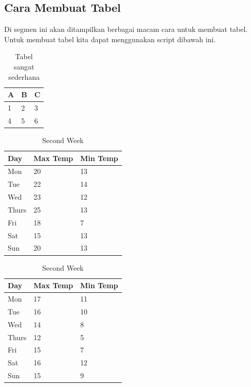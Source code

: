 \subsection{Cara Membuat Tabel}{
    Di segmen ini akan ditampilkan berbagai macam cara untuk membuat tabel. Untuk membuat tabel kita dapat menggunakan script dibawah ini. 
    \begin{table}[h]
        \centering
        \caption{Tabel sangat sederhana}
        \label{tab:abc}
        \begin{tabular}{| l | l | l |}
            \hline
            A & B & C \\
            \hline
            1 & 2 & 3 \\
            4 & 5 & 6 \\
            \hline
        \end{tabular}
    \end{table}

    \begin{table}[h]
        \centering
        \caption{Suhu max dan min di bulan Juni}
        \label{tab:temps}
        \begin{subtable}[h]{0.45\textwidth}
            \centering
            \begin{tabular}{l | l | l}
            Day & Max Temp & Min Temp \\
            \hline \hline
            Mon & 20 & 13\\
            Tue & 22 & 14\\
            Wed & 23 & 12\\
            Thurs & 25 & 13\\
            Fri & 18 & 7\\
            Sat & 15 & 13\\
            Sun & 20 & 13
           \end{tabular}
           \caption{First Week}
           \label{tab:week1}
        \end{subtable}
        \hfill
        \begin{subtable}[h]{0.45\textwidth}
            \centering
            \begin{tabular}{l | l | l}
            Day & Max Temp & Min Temp \\
            \hline \hline
            Mon & 17 & 11\\
            Tue & 16 & 10\\
            Wed & 14 & 8\\
            Thurs & 12 & 5\\
            Fri & 15 & 7\\
            Sat & 16 & 12\\
            Sun & 15 & 9
            \end{tabular}
            \caption{Second Week}
            \label{tab:week2}
         \end{subtable}
    \end{table}
}

